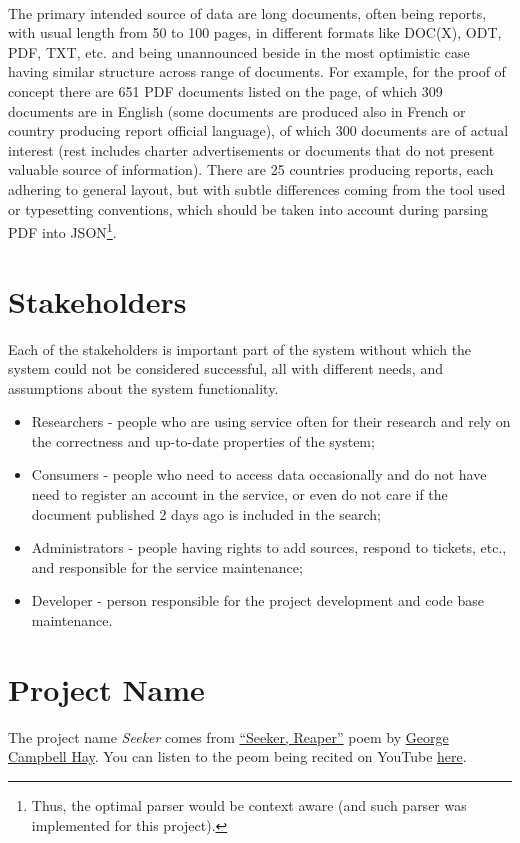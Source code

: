\documentclass[11pt, a4paper]{report}
\begin{document}
\paragraph{}
The primary intended source of data are long documents, often being reports, with usual length from 50 to 100 pages, in different formats like DOC(X), ODT, PDF, TXT, etc. and being unannounced beside in the most optimistic case having similar structure across range of documents. For example, for the proof of concept there are 651 PDF documents listed on the page, of which 309 documents are in English (some documents are produced also in French or country producing report official language), of which 300 documents are of actual interest (rest includes charter advertisements or documents that do not present valuable source of information). There are 25 countries producing reports, each adhering to general layout, but with subtle differences coming from the tool used or typesetting conventions, which should be taken into account during parsing PDF into JSON\footnote{Thus, the optimal parser would be context aware (and such parser was implemented for this project).}.

\section{Stakeholders}

Each of the stakeholders is important part of the system without which the system could not be considered successful, all with different needs, and assumptions about the system functionality.

\begin{itemize}
  \item Researchers - people who are using service often for their research and rely on the correctness and up-to-date properties of the system;
  \item Consumers - people who need to access data occasionally and do not have need to register an account in the service, or even do not care if the document published 2 days ago is included in the search;
  \item Administrators - people having rights to add sources, respond to tickets, etc., and responsible for the service maintenance;
  \item Developer - person responsible for the project development and code base maintenance.
\end{itemize}

\section{Project Name}
The project name \emph{Seeker} comes from \href{http://www.scottishpoetrylibrary.org.uk/poetry/poems/seeker-reaper}{``Seeker, Reaper''} poem by \href{http://en.wikipedia.org/wiki/George_Campbell_Hay}{George Campbell Hay}. You can listen to the peom being recited on YouTube \href{https://www.youtube.com/watch?v=gjxPtRZFF24}{here}.
\end{document}
